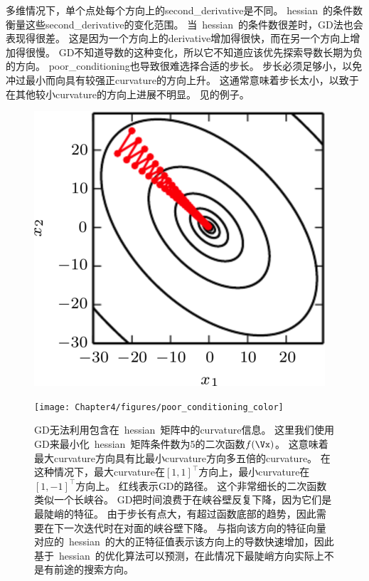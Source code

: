 多维情况下，单个点处每个方向上的\gls{second_derivative}是不同。
\gls{hessian}~的条件数衡量这些\gls{second_derivative}的变化范围。
当~\gls{hessian}~的条件数很差时，\gls{GD}法也会表现得很差。
这是因为一个方向上的\gls{derivative}增加得很快，而在另一个方向上增加得很慢。
\gls{GD}不知道导数的这种变化，所以它不知道应该优先探索导数长期为负的方向。
\gls{poor_conditioning}也导致很难选择合适的步长。
步长必须足够小，以免冲过最小而向具有较强正\gls{curvature}的方向上升。
这通常意味着步长太小，以致于在其他较小\gls{curvature}的方向上进展不明显。
见的例子。
\begin{figure}[!htb]
\ifOpenSource
\centerline{\includegraphics[scale=0.5]{images/29.png}}
\else
\centerline{\texttt{[image: Chapter4/figures/poor\_conditioning\_color]}}
\fi
\caption{\gls{GD}无法利用包含在~\gls{hessian}~矩阵中的\gls{curvature}信息。
这里我们使用\gls{GD}来最小化~\gls{hessian}~矩阵条件数为5的二次函数$f(\Vx)$。
这意味着最大\gls{curvature}方向具有比最小\gls{curvature}方向多五倍的\gls{curvature}。
在这种情况下，最大\gls{curvature}在$[1,1]^\top$方向上，最小\gls{curvature}在$[1,-1]^\top$方向上。
红线表示\gls{GD}的路径。
这个非常细长的二次函数类似一个长峡谷。
\gls{GD}把时间浪费于在峡谷壁反复下降，因为它们是最陡峭的特征。
由于步长有点大，有超过函数底部的趋势，因此需要在下一次迭代时在对面的峡谷壁下降。
与指向该方向的特征向量对应的~\gls{hessian}~的大的正特征值表示该方向上的导数快速增加，因此基于~\gls{hessian}~的优化算法可以预测，在此情况下最陡峭方向实际上不是有前途的搜索方向。
}
\label{fig:chap4_poor_conditioning_color}
\end{figure}

